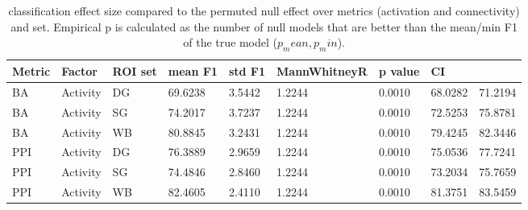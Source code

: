 \begin{table}
\centering
\begin{tabular}[0.2em]{@{}lllllllll@{}}\toprule
Metric & Factor & ROI set & mean F1 & std F1 & MannWhitneyR & p value & CI\\\toprule[0.2em]
BA & Activity & DG & 69.6238 & 3.5442 & 1.2244 & 0.0010 & 68.0282 & 71.2194 \\\midrule
BA & Activity & SG & 74.2017 & 3.7237 & 1.2244 & 0.0010 & 72.5253 & 75.8781 \\\midrule
BA & Activity & WB & 80.8845 & 3.2431 & 1.2244 & 0.0010 & 79.4245 & 82.3446 \\\midrule
PPI & Activity & DG & 76.3889 & 2.9659 & 1.2244 & 0.0010 & 75.0536 & 77.7241 \\\midrule
PPI & Activity & SG & 74.4846 & 2.8460 & 1.2244 & 0.0010 & 73.2034 & 75.7659 \\\midrule
PPI & Activity & WB & 82.4605 & 2.4110 & 1.2244 & 0.0010 & 81.3751 & 83.5459 \\\bottomrule[0.2em]
\end{tabular}
\caption{classification effect size compared to the permuted null effect over metrics (activation and connectivity) and set. Empirical p is calculated as the number of null models that are better than the mean/min F1 of the true model ($p_mean,p_min$).\label{tabel:ClassificationEffect}}
\end{table}
